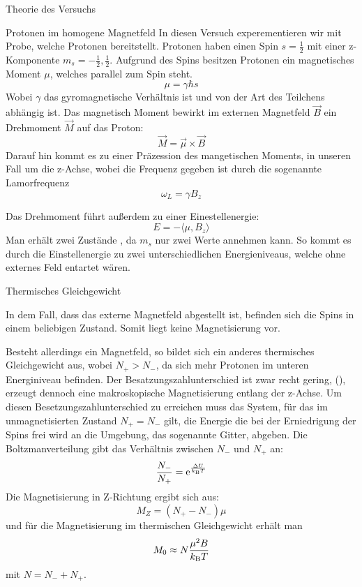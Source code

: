 \documentclass[pdftex, a4paper,11pt, twoside, ngerman]{report}
\begin{document}
  \begin{chapter}{Theorie des Versuchs}
    \label{chp:Theorie}
    
    \begin{section}{Protonen im homogene Magnetfeld}
        In diesen Versuch experementieren wir mit Probe, welche Protonen bereitstellt.
        Protonen haben einen Spin $ s = \frac 12$ mit einer z-Komponente $m_s = -\frac 12 , \frac 12$.
        Aufgrund des Spins besitzen Protonen ein magnetisches Moment $\mu$, welches parallel zum Spin steht.
        \[
            \mu = \gamma\hbar s
        \]
        Wobei $\gamma$ das gyromagnetische Verhältnis ist und von der Art des Teilchens abhängig ist.
        Das magnetisch Moment bewirkt im externen Magnetfeld $\vec B$ ein Drehmoment $\vec M$ auf das Proton:
        \[
            \vec M = \vec \mu \times \vec B
        \]
        Darauf hin kommt es zu einer Präzession des mangetischen Moments, in unseren Fall um die z-Achse, wobei die Frequenz gegeben ist durch die sogenannte Lamorfrequenz 
        \[
            \omega_L = \gamma B_z
        \]

        Das Drehmoment führt außerdem zu einer Einestellenergie:
        \[
            E = -\langle \mu ,B_z\rangle
        \]
        Man erhält zwei Zustände , da $m_s$ nur zwei Werte annehmen kann.
        So kommt es durch die Einstellenergie zu zwei unterschiedlichen Energieniveaus, welche ohne externes Feld entartet wären.

    \end{section}
    
    \begin{section}{Thermisches Gleichgewicht}

        In dem Fall, dass das externe Magnetfeld abgestellt ist, befinden sich die Spins in einem beliebigen Zustand.
        Somit liegt keine Magnetisierung vor.

        Besteht allerdings ein Magnetfeld, so bildet sich ein anderes thermisches Gleichgewicht aus, wobei $N_+>N_-$, da sich mehr Protonen im unteren Energiniveau befinden.
        Der Besatzungszahlunterschied ist zwar recht gering, (), erzeugt dennoch eine makroskopische Magnetisierung entlang der z-Achse.
        Um diesen Besetzungszahlunterschied zu erreichen muss das System, für das im unmagnetisierten Zustand $N_+=N_-$ gilt, die Energie die bei der Erniedrigung der Spins frei wird an die Umgebung, das sogenannte Gitter, abgeben.
        Die Boltzmanverteilung gibt das Verhältnis zwischen $N_-$ und $N_+$ an:
        \[
            \frac{N_-}{N_+} = \mathrm e^{\frac{\Delta U}{k_\text BT}}
        \]
        Die Magnetisierung in Z-Richtung ergibt sich aus:
        \[
            M_Z = (N_+-N_-)\mu
        \]
        und für die Magnetisierung im thermischen Gleichgewicht erhält man
        \[
            M_0 \approx N\frac{\mu^2B}{k_\text BT}
        \]
        mit $N=N_-+N_+$.


\end{section}
\end{chapter}
\end{document}
